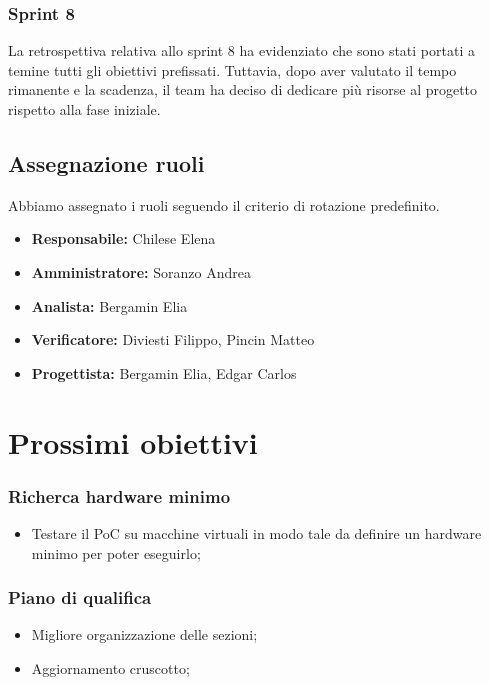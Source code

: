 \subsubsection{Sprint 8}
La retrospettiva relativa allo sprint 8 ha evidenziato che sono stati portati a temine tutti gli obiettivi prefissati.
Tuttavia, dopo aver valutato il tempo rimanente e la scadenza, il team ha deciso di dedicare più risorse al progetto rispetto alla fase iniziale.

\subsection{Assegnazione ruoli}
Abbiamo assegnato i ruoli seguendo il criterio di rotazione predefinito.
\begin{itemize}
    \item \textbf{Responsabile:} Chilese Elena
    \item \textbf{Amministratore:} Soranzo Andrea
    \item \textbf{Analista:} Bergamin Elia
    \item \textbf{Verificatore:} Diviesti Filippo, Pincin Matteo
    \item  \textbf{Progettista:} Bergamin Elia, Edgar Carlos
\end{itemize}
\newpage

\section{Prossimi obiettivi}

\subsubsection{Richerca hardware minimo}
\begin{itemize}
    \item Testare il PoC su macchine virtuali in modo tale da definire un hardware minimo per poter eseguirlo;
\end{itemize}

\subsubsection{Piano di qualifica}
\begin{itemize}
    \item Migliore organizzazione delle sezioni;
    \item Aggiornamento cruscotto;
\end{itemize}


